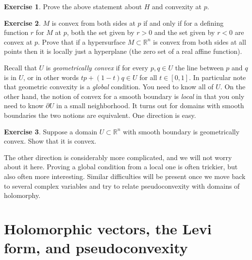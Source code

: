 \documentclass[12pt,openany]{book}
\newcommand{\R}{{\mathbb{R}}}
\newcommand{\myindex}[1]{#1\index{#1}}
\theoremstyle{plain}
\theoremstyle{remark}
\theoremstyle{definition}
\newenvironment{exbox}{%
    \def\FrameCommand{\vrule width 1pt \relax\hspace {10pt}}%
    \MakeFramed {\advance \hsize -\width \FrameRestore }%
}{%
    \endMakeFramed
}
\theoremstyle{exercise}
\newtheorem{exercise}{Exercise}[section]
\theoremstyle{example}
\begin{document}
\begin{exbox}
\begin{exercise}
Prove the above statement about $H$ and convexity at $p$.
\end{exercise}

\begin{exercise}
$M$ is convex from both sides at $p$ if and only if for a
defining function $r$ for $M$ at $p$, both the set given by
$r > 0$ and the set given by $r < 0$ are convex at $p$.
Prove that if a hypersurface $M \subset \R^n$ is convex from both sides at all
points then it is locally just a hyperplane (the zero set of a real affine
function).
\end{exercise}
\end{exbox}

Recall that $U$ is \emph{\myindex{geometrically convex}} if for every $p,q \in U$ the
line between $p$ and $q$ is in $U$, or in other words
$tp +(1-t)q \in U$ for all $t \in [0,1]$.
In particular note that geometric convexity is a \emph{global} condition.  You need 
to know all of $U$.  On the other hand, the notion of convex for a smooth boundary is
\emph{local} in that you only need to know $\partial U$ in a small
neighborhood.  It turns out for domains with
smooth boundaries the two notions are equivalent.  One direction is easy.

\begin{exbox}
\begin{exercise}
Suppose a domain $U \subset \R^n$ with smooth
boundary is geometrically
convex.  Show that it is convex.
\end{exercise}
\end{exbox}

The other direction is considerably more complicated, and we will not worry
about it here.  Proving a global condition from a local one is often
trickier, but also often more interesting.
Similar difficulties will be present once we move back to
several complex variables and try to relate pseudoconvexity with domains of
holomorphy.


\section{Holomorphic vectors, the Levi form, and pseudoconvexity}
\end{document}
